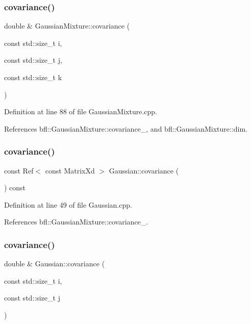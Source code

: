 \subsubsection{\texorpdfstring{covariance()}{covariance()}\hspace{0.1cm}{\footnotesize\ttfamily [3/8]}}
{\footnotesize\ttfamily double \& Gaussian\+Mixture\+::covariance (\begin{DoxyParamCaption}\item[{const std\+::size\+\_\+t}]{i,  }\item[{const std\+::size\+\_\+t}]{j,  }\item[{const std\+::size\+\_\+t}]{k }\end{DoxyParamCaption})\hspace{0.3cm}{\ttfamily [inherited]}}



Definition at line 88 of file Gaussian\+Mixture.\+cpp.



References bfl\+::\+Gaussian\+Mixture\+::covariance\+\_\+, and bfl\+::\+Gaussian\+Mixture\+::dim.

\mbox{\label{classbfl_1_1Gaussian_a696a82cf8c335970e5280010f5b8bc9f}} 
\subsubsection{\texorpdfstring{covariance()}{covariance()}\hspace{0.1cm}{\footnotesize\ttfamily [4/8]}}
{\footnotesize\ttfamily const Ref$<$ const Matrix\+Xd $>$ Gaussian\+::covariance (\begin{DoxyParamCaption}{ }\end{DoxyParamCaption}) const}



Definition at line 49 of file Gaussian.\+cpp.



References bfl\+::\+Gaussian\+Mixture\+::covariance\+\_\+.

\mbox{\label{classbfl_1_1Gaussian_ac24bc21ce7fbcf4999e88c1957697bd6}} 
\subsubsection{\texorpdfstring{covariance()}{covariance()}\hspace{0.1cm}{\footnotesize\ttfamily [5/8]}}
{\footnotesize\ttfamily double \& Gaussian\+::covariance (\begin{DoxyParamCaption}\item[{const std\+::size\+\_\+t}]{i,  }\item[{const std\+::size\+\_\+t}]{j }\end{DoxyParamCaption})}



